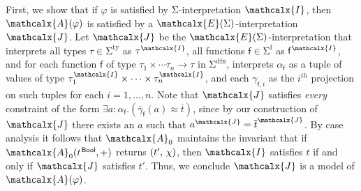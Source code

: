 \documentclass[runningheads,a4paper]{llncs}
\newcommand{\con}[1]{\mathsf{#1}}
\renewcommand\vec[1]{\overline{#1}}
\let\oldchi=\chi
\def\chi{{\vthinspace\oldchi}}
\let\oldSigma=\Sigma
\def\Sigma{\mathrm{\oldSigma}}
\newcommand{\teq}{\approx}
\newcommand{\I}{\mathcalx{I}}
\newcommand{\J}{\mathcalx{J}}
\newcommand{\conv}{\mathcalx{A}}
\newcommand{\stypes}[1]{#1^\mathrm{ty}}
\newcommand{\sfuns}[1]{#1^\mathrm{f}}
\newcommand{\sfundefs}[1]{#1^\mathrm{dfn}}
\newcommand{\ppos}{{+}}
\newcommand\ty[1]{\con{#1}}
\newcommand{\Bool}{\ty{Bool}}
\newcommand\concret{\gamma} %
\newcommand{\vecfarg}[1]{\vec{\concret}_{#1}}
\newcommand{\fargx}[2]{\concret_{#1,#2}}
\newcommand{\fargtype}[1]{\alpha_{#1}}
\newcommand{\extendsig}[1]{\mathcalx{E}( #1 )}
\newcommand{\vthinspace}{\kern+0.083333em}
\newcommand{\typ}[1]{^{\vthinspace #1}}
\begin{document}
\begin{proofsketch}
First, we show that if $\varphi$ is satisfied by $\Sigma$-interpretation $\I$, then $\conv( \varphi )$ is satisfied by a $\extendsig{\Sigma}$-interpretation $\J$.
Let $\J$ be the $\extendsig{\Sigma}$-interpretation that interprets all types $\tau \in \stypes{\Sigma}$ as $\tau^\I$,
all functions $\con{f} \in \sfuns{\Sigma}$ as $\con{f}^\I$,
and for each function $\con{f}$ of type $\tau_1 \times \cdots \tau_n \rightarrow \tau$ in $\sfundefs{\Sigma}$,
interprets $\fargtype{\con{f}}$ as a tuple of values of type $\tau_1^\I \times \cdots \times \tau_n^\I$,
and each $\fargx{\con{f}}{i}$ as the $i^{th}$ projection on such tuples for each $i = 1, \ldots, n$.
Note that $\J$ satisfies \emph{every} constraint of the form $\exists a : {\fargtype{\con{f}}}. ( \vecfarg{\con{f}}( a ) \teq \vec t )$,
since by our construction of $\J$ there exists an $a$ such that $a^\J = \vec t^\J$.
By case analysis it follows that $\conv_0$ maintains the invariant that
if $\conv_0( t\typ{\Bool}, \ppos )$ returns $( {t'}, \chi )$,
then $\I$ satisfies $t$ if and only if $\J$ satisfies $t'$.
Thus, we conclude $\J$ is a model of $\conv( \varphi )$.


\end{proofsketch}
\end{document}
